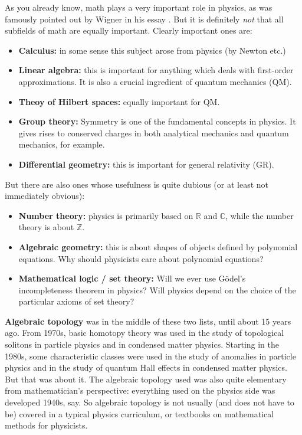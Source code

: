 \documentclass[12pt]{article}
\numberwithin{equation}{section}
\def\bC{\mathbb{C}}
\def\bR{\mathbb{R}}
\def\bZ{\mathbb{Z}}
\begin{document}
As you already know, math plays a very important role in physics, 
as was famously pointed out by Wigner in his essay \cite{WignerUnreasonable}.
But it is definitely \emph{not} that all subfields of math are equally important.
Clearly important ones are:
\begin{itemize}
  \item \textbf{Calculus:} in some sense this subject arose from physics (by Newton etc.)
  \item \textbf{Linear algebra:} this is important for anything which deals with first-order approximations. 
  It is also a crucial ingredient of quantum mechanics (QM).
  \item \textbf{Theoy of Hilbert spaces:} equally important for QM.
  \item \textbf{Group theory:} Symmetry is one of the fundamental concepts in physics. It gives rises to conserved charges in both analytical mechanics and quantum mechanics, for example.
  \item \textbf{Differential geometry:} this is important for general relativity (GR).
\end{itemize}

But there are also ones whose usefulness is quite dubious (or at least not immediately obvious):
\begin{itemize}
  \item \textbf{Number theory:} physics is primarily based on $\bR$ and $\bC$, 
  while the number theory is about $\bZ$.
  \item \textbf{Algebraic geometry:} this is about shapes of objects defined by polynomial equations. 
  Why should physicists care about polynomial equations?
  \item \textbf{Mathematical logic / set theory:} Will we ever use G\"odel's incompleteness theorem in physics?
  Will physics depend on the choice of the particular axioms of set theory?
\end{itemize}

\textbf{Algebraic topology} was in the middle of these two lists, until about 15 years ago.
From 1970s, basic homotopy theory was used in the study of topological solitons 
in particle physics and in condensed matter physics.
Starting in the 1980s, 
some characteristic classes were used in the study of anomalies in particle physics
and in the study of quantum Hall effects in condensed matter physics.
But that was about it.
The algebraic topology used was also quite elementary from mathematician's perspective:
everything used on the physics side was developed 1940s, say.
So  algebraic topology is not usually (and does not have to be) covered in a typical physics curriculum,
or textbooks on mathematical methods for physicists.
\end{document}

